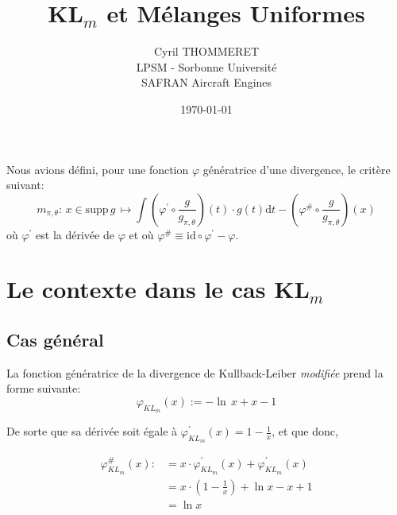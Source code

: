 \documentclass{article}
\title{KL$_m$ et Mélanges Uniformes}
\author{Cyril THOMMERET \\ LPSM - Sorbonne Université \\ SAFRAN Aircraft Engines}
\date{\today}
\begin{document}
    \maketitle
    \tableofcontents
    \vspace*{1.2cm}
    Nous avions défini, pour une fonction $\varphi$ génératrice d'une divergence, le critère suivant:
    $$ m_{\pi,\theta}:\, x\in\mathrm{supp}\,g\, \longmapsto \int(\varphi^\prime\circ\dfrac{g}{g_{\pi,\theta}})(t)\cdot{}g(t)\mathrm{d}t - (\varphi^\#\circ\dfrac{g}{g_{\pi,\theta}})(x)$$
    où $\varphi^\prime$ est la dérivée de $\varphi$ et où $\varphi^\#\equiv{}\mathrm{id}\circ\varphi^\prime - \varphi$. \\

    \section{Le contexte dans le cas KL$_m$}
    \subsection{Cas général}

    La fonction génératrice de la divergence de Kullback-Leiber \textit{modifiée} prend la forme suivante: 
    $$ \varphi_{KL_m}(x) := -\ln\,x+x-1 $$

    De sorte que sa dérivée soit égale à $\varphi_{KL_m}^\prime(x) = 1 - \frac{1}{x}$, et que donc,
    
    \begin{align*}
      \varphi^\#_{KL_m}(x)   :& = x\cdot\varphi_{KL_m}^\prime(x) + \varphi^\prime_{KL_m}(x) \\
                              & = x\cdot(1-\frac{1}{x}) + \ln{}x - x + 1 \\
                              & = \ln{}x
    \end{align*}
\end{document}
